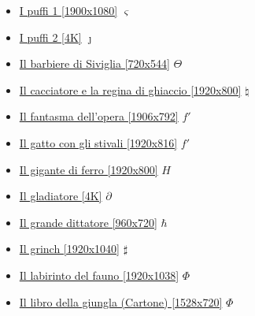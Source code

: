 		\begin{itemize}
			
			\item \href{https://mega.nz/#!lvxBiKhB!kdYiJu93nbjCFyhqUbApswvPpzF6hc05Z6GIjGqJckk} {I puffi 1 [1900x1080]}  $\varsigma$ \\
			\item \href{https://mega.nz/#!y7IhQYAJ!9u-fPtly6InIugj-qmwTlKPb8_R3zipryZojBlrTiOA} {I puffi 2 [4K]}  $\jmath$ \\
			\item \href{https://mega.nz/#!FfhAnAbA!FtzP0wII4zXHj6uPndEoKtaO0sEOVunBk8_Aid-2oGo} {Il barbiere di Siviglia [720x544]}  $\varTheta$ \\
			\item \href{https://mega.nz/#!FmRwzawC!4-0vOan9vkVpdPnyU8iVyTxgQSCvkbsMBFPtbxZTD18} {Il cacciatore e la regina di ghiaccio [1920x800]}  $\natural$ \\
			\item \href{https://mega.nz/#!2nJCgCAD!prw6sv8aChsVb40HRzZ5IkvB8R-4Jfk3KHpJ4Kwu0_s} {Il fantasma dell'opera [1906x792]}  $f'$ \\
			\item \href{https://mega.nz/#!HjIS2SjA!K9AEH25mXw5Ipvr8iO0KaL6kHuy57XW0DjPQ9MoWHV4} {Il gatto con gli stivali [1920x816]}  $f'$ \\
			\item \href{https://mega.nz/#!u8JTBJBI!_q_kcpmKlLg4zK98YoiHBwYnQotd1RIeqOHIIiYJK7s} {Il gigante di ferro [1920x800]}  $H$ \\
			\item \href{https://mega.nz/#!Xbp3mLrQ!t4EArcFmBxMaC3dqpTicSSb_EzOk8QbIa_Zg6asnc9E} {Il gladiatore [4K]}  $\partial$ \\
			\item \href{https://mega.nz/#!nmA0ibxJ!tcp_8_pTFwDVbeIhFUpSiZYBJDBlAcd4qCM_0-xq1S8} {Il grande dittatore [960x720]}  $\hbar$ \\
			\item \href{https://mega.nz/#!svxl3ZYR!EUVyH0uSiUUI2cBwfhmn2jmbXd_JP6klOw93KoHPaU8} {Il grinch [1920x1040]}  $\sharp$ \\
			\item \href{https://mega.nz/#!xCwVFbaD!WPPP_1_0JT-5KcNAAnZhh_C2bd7T9LlfQAYIKBbfBac} {Il labirinto del fauno [1920x1038]}  $\Phi$ \\  
			\item \href{https://mega.nz/#!pOQFFALZ!kcn-ZReKdwCCJPvmbBf_ukCKgfglHYuvZB4waP3ApBc} {Il libro della giungla (Cartone) [1528x720]}  $\Phi$ \\ 

\end{itemize}
